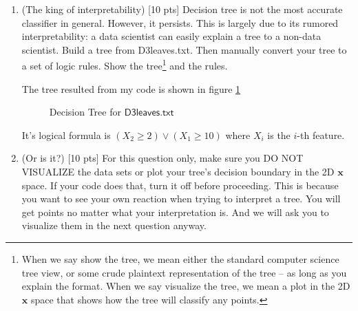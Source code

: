 \documentclass[a4paper]{article}
\theoremstyle{definition}
\def\x{\mathbf x}
\newenvironment{soln}{
    \leavevmode\color{blue}\ignorespaces
}{}
\begin{document}
\begin{enumerate}
\begin{soln}
\end{soln}

\item (The king of interpretability)  [10 pts] Decision tree is not the most accurate classifier in general.  However, it persists.  This is largely due to its rumored interpretability: a data scientist can easily explain a tree to a non-data scientist.  Build a tree from D3leaves.txt.  Then manually convert your tree to a set of logic rules.  Show the tree\footnote{When we say show the tree, we mean either the standard computer science tree view, or some crude plaintext representation of the tree -- as long as you explain the format.  When we say visualize the tree, we mean a plot in the 2D $\x$ space that shows how the tree will classify any points.} and the rules. \\

\begin{soln}
    The tree resulted from my code is shown in figure \ref{fig:2}
    \begin{figure}[h]
        \centering
        \caption{Decision Tree for $\mathsf{D3leaves.txt}$}
        \label{fig:2}
    \end{figure}

    It's logical formula is $(X_2 \geq 2) \vee (X_1 \geq 10)$ where $X_i$ is the $i$-th feature.
    
\end{soln}

\item (Or is it?)  [10 pts] For this question only, make sure you DO NOT VISUALIZE the data sets or plot your tree's decision boundary in the 2D $\x$ space.  If your code does that, turn it off before proceeding.  This is because you want to see your own reaction when trying to interpret a tree.  You will get points no matter what your interpretation is.
And we will ask you to visualize them in the next question anyway.
  \begin{itemize}
  

\end{itemize}
\end{enumerate}
\end{document}
